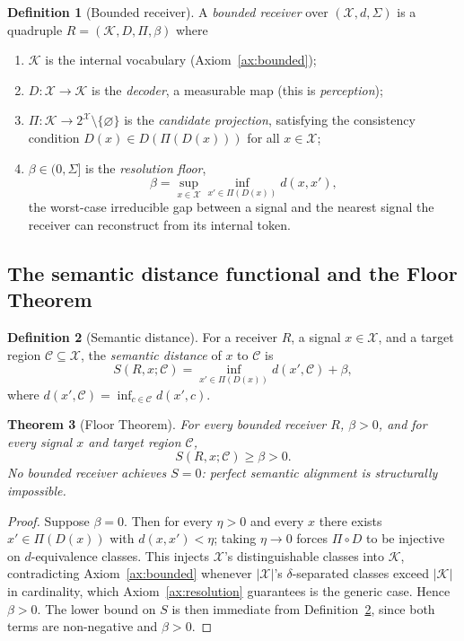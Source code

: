 \documentclass[twocolumn,11pt,a4paper]{article}
\theoremstyle{main}
\newtheorem{theorem}{Theorem}[section]
\theoremstyle{definition}
\newtheorem{definition}[theorem]{Definition}
\theoremstyle{remark}
\newcommand{\Out}{\mathcal{X}}
\newcommand{\Know}{\mathcal{K}}
\newcommand{\Cell}{\mathcal{C}}
\newcommand{\Dec}{D}
\newcommand{\Proj}{\Pi}
\newcommand{\Recv}{R}
\newcommand{\Sval}{S}
\newcommand{\floor}{\beta}
\newcommand{\dist}{d}
\newcommand{\Sig}{\Sigma}
\begin{document}
\begin{definition}[Bounded receiver]
\label{def:receiver}
A \emph{bounded receiver} over $(\Out, \dist, \Sig)$ is a quadruple
$\Recv = (\Know, \Dec, \Proj, \floor)$ where
\begin{enumerate}[label=(\roman*), leftmargin=1.8em, itemsep=1pt]
\item $\Know$ is the internal vocabulary (Axiom~\ref{ax:bounded});
\item $\Dec : \Out \to \Know$ is the \emph{decoder}, a measurable map
  (this is \emph{perception});
\item $\Proj : \Know \to 2^\Out \setminus \{\varnothing\}$ is the
  \emph{candidate projection}, satisfying the consistency condition
  $\Dec(x) \in \Dec(\Proj(\Dec(x)))$ for all $x \in \Out$;
\item $\floor \in (0, \Sig]$ is the \emph{resolution floor},
  \[
    \floor = \sup_{x \in \Out} \inf_{x' \in \Proj(\Dec(x))} \dist(x, x'),
  \]
  the worst-case irreducible gap between a signal and the nearest
  signal the receiver can reconstruct from its internal token.
\end{enumerate}
\end{definition}

\subsection{The semantic distance functional and the Floor Theorem}

\begin{definition}[Semantic distance]
\label{def:sdist}
For a receiver $\Recv$, a signal $x \in \Out$, and a target region
$\Cell \subseteq \Out$, the \emph{semantic distance} of $x$ to $\Cell$
is
\[
  \Sval(\Recv, x; \Cell) = \inf_{x' \in \Proj(\Dec(x))} \dist(x', \Cell)
  + \floor,
\]
where $\dist(x', \Cell) = \inf_{c \in \Cell} \dist(x', c)$.
\end{definition}

\begin{theorem}[Floor Theorem]
\label{thm:floor}
For every bounded receiver $\Recv$, $\floor > 0$, and for every signal
$x$ and target region $\Cell$,
\[
  \Sval(\Recv, x; \Cell) \geq \floor > 0.
\]
No bounded receiver achieves $\Sval = 0$: perfect semantic alignment is
structurally impossible.
\end{theorem}

\begin{proof}
Suppose $\floor = 0$. Then for every $\eta > 0$ and every $x$ there
exists $x' \in \Proj(\Dec(x))$ with $\dist(x, x') < \eta$; taking
$\eta \to 0$ forces $\Proj \circ \Dec$ to be injective on
$\dist$-equivalence classes. This injects $\Out$'s distinguishable
classes into $\Know$, contradicting Axiom~\ref{ax:bounded} whenever
$|\Out|$'s $\delta$-separated classes exceed $|\Know|$ in cardinality,
which Axiom~\ref{ax:resolution} guarantees is the generic case. Hence
$\floor > 0$. The lower bound on $\Sval$ is then immediate from
Definition~\ref{def:sdist}, since both terms are non-negative and
$\floor > 0$.
\end{proof}
\end{document}
